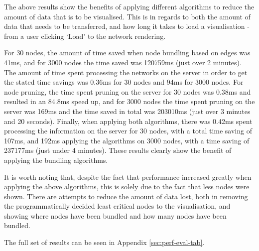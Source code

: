 \documentclass[../dissertation.tex]{subfiles}
\begin{document}
The above results show the benefits of applying different algorithms to reduce the amount of data that is to be visualised. This is in regards to both the amount of data that needs to be transferred, and how long it takes to load a visualisation - from a user clicking `Load' to the network rendering. 

For 30 nodes, the amount of time saved when node bundling based on edges was 41ms, and for 3000 nodes the time saved was 120759ms (just over 2 minutes). The amount of time spent processing the networks on the server in order to get the stated time savings was 0.36ms for 30 nodes and 94ms for 3000 nodes. For node pruning, the time spent pruning on the server for 30 nodes was 0.38ms and resulted in an 84.8ms speed up, and for 3000 nodes the time spent pruning on the server was 169ms and the time saved in total was 203010ms (just over 3 minutes and 20 seconds). Finally, when applying both algorithms, there was 0.42ms spent processing the information on the server for 30 nodes, with a total time saving of 107ms, and 192ms applying the algorithms on 3000 nodes, with a time saving of 237177ms (just under 4 minutes). These results clearly show the benefit of applying the bundling algorithms.

It is worth noting that, despite the fact that performance increased greatly when applying the above algorithms, this is solely due to the fact that less nodes were shown. There are attempts to reduce the amount of data lost, both in removing the programmatically decided least critical nodes to the visualisation, and showing where nodes have been bundled and how many nodes have been bundled.

The full set of results can be seen in Appendix \ref{sec:perf-eval-tab}.
\end{document}

